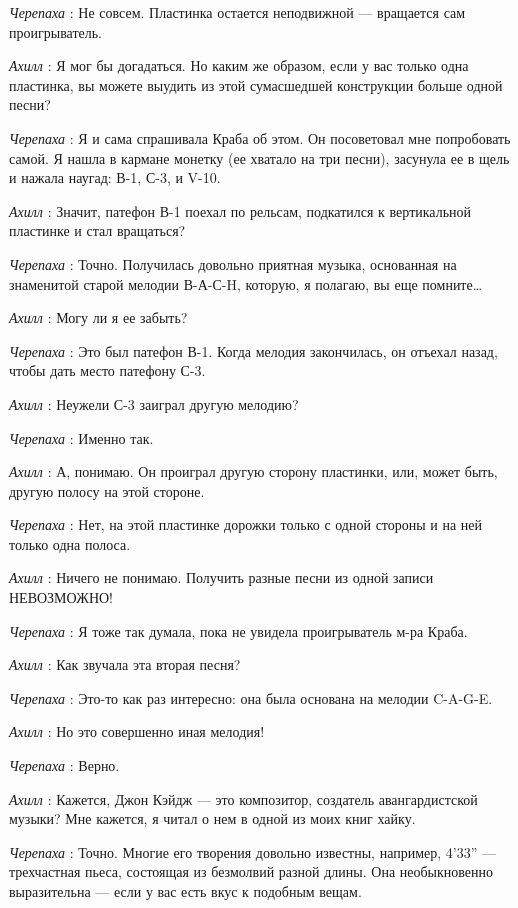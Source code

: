 \emph{Черепаха} : Не совсем. Пластинка остается неподвижной --- вращается сам проигрыватель.

\emph{Ахилл} : Я мог бы догадаться. Но каким же образом, если у вас только одна пластинка, вы можете выудить из этой сумасшедшей конструкции больше одной песни?

\emph{Черепаха} : Я и сама спрашивала Краба об этом. Он посоветовал мне попробовать самой. Я нашла в кармане монетку (ее хватало на три песни), засунула ее в щель и нажала наугад: В-1, С-3, и V-10.

\emph{Ахилл} : Значит, патефон В-1 поехал по рельсам, подкатился к вертикальной пластинке и стал вращаться?

\emph{Черепаха} : Точно. Получилась довольно приятная музыка, основанная на знаменитой старой мелодии В-А-С-H, которую, я полагаю, вы еще помните\ldots{}

\emph{Ахилл} : Могу ли я ее забыть?

\emph{Черепаха} : Это был патефон В-1. Когда мелодия закончилась, он отъехал назад, чтобы дать место патефону С-3.

\emph{Ахилл} : Неужели С-3 заиграл другую мелодию?

\emph{Черепаха} : Именно так.

\emph{Ахилл} : А, понимаю. Он проиграл другую сторону пластинки, или, может быть, другую полосу на этой стороне.

\emph{Черепаха} : Нет, на этой пластинке дорожки только с одной стороны и на ней только одна полоса.

\emph{Ахилл} : Ничего не понимаю. Получить разные песни из одной записи НЕВОЗМОЖНО!

\emph{Черепаха} : Я тоже так думала, пока не увидела проигрыватель м-ра Краба.

\emph{Ахилл} : Как звучала эта вторая песня?

\emph{Черепаха} : Это-то как раз интересно: она была основана на мелодии C-A-G-E.

\emph{Ахилл} : Но это совершенно иная мелодия!

\emph{Черепаха} : Верно.

\emph{Ахилл} : Кажется, Джон Кэйдж --- это композитор, создатель авангардистской музыки? Мне кажется, я читал о нем в одной из моих книг хайку.

\emph{Черепаха} : Точно. Многие его творения довольно известны, например, 4'33'' --- трехчастная пьеса, состоящая из безмолвий разной длины. Она необыкновенно выразительна --- если у вас есть вкус к подобным вещам.

